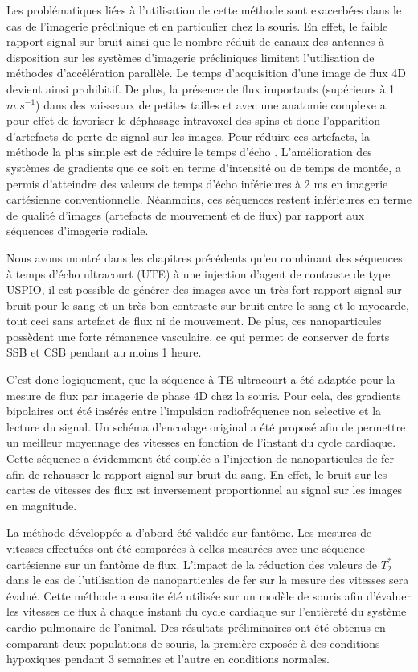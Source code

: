 Les problématiques liées à l'utilisation de cette méthode sont exacerbées dans le cas de l'imagerie préclinique et en particulier chez la souris. En effet, le faible rapport signal-sur-bruit ainsi que le nombre réduit de canaux des antennes à disposition sur les systèmes d'imagerie précliniques limitent l'utilisation de méthodes d'accélération parallèle. Le temps d'acquisition d'une image de flux 4D devient ainsi prohibitif. De plus, la présence de flux importants (supérieurs à 1 $m.s^{-1}$) dans des vaisseaux de petites tailles et avec une anatomie complexe a pour effet de favoriser le déphasage intravoxel des spins et donc l'apparition d'artefacts de perte de signal sur les images. Pour réduire ces artefacts, la méthode la plus simple est de réduire le temps d'écho \cite{staahlberg1994pulse,OBrien:2008aa}. L'amélioration des systèmes de gradients que ce soit en terme d'intensité ou de temps de montée, a permis d'atteindre des valeurs de temps d'écho inférieures à 2 ms en imagerie cartésienne conventionnelle. Néanmoins, ces séquences restent inférieures en terme de qualité d'images (artefacts de mouvement et de flux) par rapport aux séquences d'imagerie radiale.

Nous avons montré dans les chapitres précédents qu’en combinant des séquences à temps d’écho ultracourt (UTE) à une injection d’agent de contraste de type USPIO, il est possible de générer des images avec un très fort rapport signal-sur-bruit pour le sang et un très bon contraste-sur-bruit entre le sang et le myocarde, tout ceci sans artefact de flux ni de mouvement. De plus, ces nanoparticules possèdent une forte rémanence vasculaire, ce qui permet de conserver de forts SSB et CSB pendant au moins 1 heure.

C’est donc logiquement, que la séquence à TE ultracourt a été adaptée pour la mesure de flux par imagerie de phase 4D chez la souris. Pour cela, des gradients bipolaires ont été insérés entre l’impulsion radiofréquence non selective et la lecture du signal. Un schéma d’encodage original a été proposé afin de permettre un meilleur moyennage des vitesses en fonction de l’instant du cycle cardiaque. 
Cette séquence a évidemment été couplée a l’injection de nanoparticules de fer afin de rehausser le rapport signal-sur-bruit du sang. En effet, le bruit sur les cartes de vitesses des flux est inversement proportionnel au signal sur les images en magnitude.

La méthode développée a d’abord été validée sur fantôme. Les mesures de vitesses effectuées ont été comparées à celles mesurées avec une séquence cartésienne sur un fantôme de flux. L’impact de la réduction des valeurs de $T_2^*$ dans le cas de l’utilisation de nanoparticules de fer sur la mesure des vitesses sera évalué. Cette méthode a ensuite été utilisée sur un modèle de souris afin d’évaluer les vitesses de flux à chaque instant du cycle cardiaque sur l’entièreté du système cardio-pulmonaire de l’animal. Des résultats préliminaires ont été obtenus en comparant deux populations de souris, la première exposée à des conditions hypoxiques pendant 3 semaines et l’autre en conditions normales.

